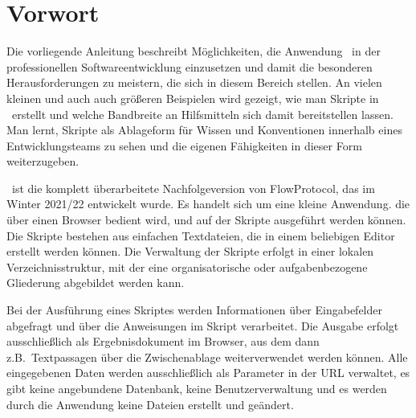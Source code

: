 \chapter*{Vorwort}
Die vorliegende Anleitung beschreibt Möglichkeiten, die Anwendung \FPZ\ in der professionellen Softwareentwicklung einzusetzen und damit die besonderen Herausforderungen zu meistern, die sich in diesem Bereich stellen. An vielen kleinen und auch auch größeren Beispielen wird gezeigt, wie man Skripte in \FPZ\ erstellt und welche Bandbreite an Hilfsmitteln sich damit bereitstellen lassen. Man lernt, Skripte als Ablageform für Wissen und Konventionen innerhalb eines Entwicklungsteams zu sehen und die eigenen Fähigkeiten in dieser Form weiterzugeben.

\FPZ\ ist die komplett überarbeitete Nachfolgeversion von FlowProtocol, das im Winter 2021/22 entwickelt wurde. Es handelt sich um eine kleine Anwendung. die über einen Browser bedient wird, und auf der Skripte ausgeführt werden können. Die Skripte bestehen aus einfachen Textdateien, die in einem beliebigen Editor erstellt werden können. Die Verwaltung der Skripte erfolgt in einer lokalen Verzeichnisstruktur, mit der eine organisatorische oder aufgabenbezogene Gliederung abgebildet werden kann.

Bei der Ausführung eines Skriptes werden Informationen über Eingabefelder abgefragt und über die Anweisungen im Skript verarbeitet. Die Ausgabe erfolgt ausschließlich als Ergebnisdokument im Browser, aus dem dann z.B.\ Textpassagen über die Zwischenablage weiterverwendet werden können. Alle eingegebenen Daten werden ausschließlich als Parameter in der URL verwaltet, es gibt keine angebundene Datenbank, keine Benutzerverwaltung und es werden durch die Anwendung keine Dateien erstellt und geändert.

